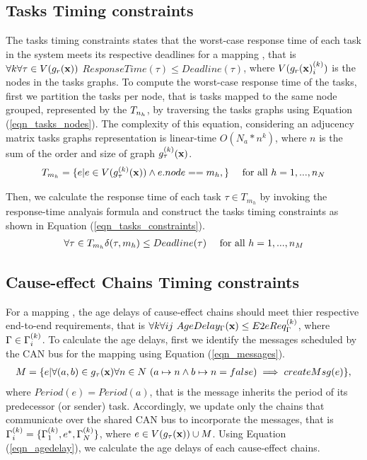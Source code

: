 \subsection{Tasks Timing constraints}
The tasks timing constraints states that the worst-case response time of each task in the system meets its respective deadlines for a mapping \ttx, that is $\forall k\forall \tau\in V(g_r(\textbf{x}))$ $ResponseTime(\tau)\leq Deadline(\tau)$, where $V(\sss{g_r(\x)})$ is the nodes in the tasks graphs. To compute the worst-case response time of the tasks, first we partition the tasks per node, that is tasks mapped to the same node grouped, represented by the $\ssb{T}[n_h]$, by traversing the tasks graphs using Equation (\ref{eqn_tasks_nodes}). The complexity of this equation, considering an adjucency matrix tasks graphs representation is linear-time $O(N_a*n^k)$, where $n$ is the sum of the order and size of graph $\sss{g}[k][\tau](\x)$.
\begin{align}
\label{eqn_tasks_nodes}
T_{m_h}&=\{e | e\in V(\sss{g}[k][\tau](\x)) \land e.node == m_h, \}& \mbox{ for all } h=1,...,n_N
\end{align}

Then, we calculate the response time of each task $\tau \in T_{m_h}$ by invoking the response-time analyais formula and construct the tasks timing constraints as shown in Equation (\ref{eqn_tasks_constraints}).
\begin{align}
\label{eqn_tasks_constraints}
\forall \tau\in T_{m_h} \delta(\tau,m_h)&\leq Deadline(\tau)& \mbox{ for all } h=1,...,n_{M}\\
\end{align}

\subsection{Cause-effect Chains Timing constraints}
For a mapping \x, the age delays of cause-effect chains should meet thier respective end-to-end requirements, that is $\forall k\forall ij\ AgeDelay_\Gamma(\x)\leq \sss{E2eReq}[k][\Gamma]$, where $\Gamma\in \sss{\Gamma}$. To calculate the age delays, first we identify the messages scheduled by the CAN bus for the mapping \ttx using Equation (\ref{eqn_messages}). 
\begin{align}
\label{eqn_messages}
	M=\{e|\forall (a,b)\in g_\tau(\textbf{x})\forall n\in N\ (a\mapsto n \land b\mapsto n=false)\implies createMsg(e)\},
\end{align}
where $Period(e)=Period(a)$, that is the message inherits the period of its predecessor (or sender) task. Accordingly, we update only the chains that communicate over the shared CAN bus to incorporate the messages, that is $\sss{\Gamma}=\{\sss{\Gamma}[k][1],e^*,\sss{\Gamma}[k][N]\}$, where $e\in V(g_\tau(\textbf{x}))\cup M$. Using Equation (\ref{eqn_agedelay}), we calculate the age delays of each cause-effect chains. 



